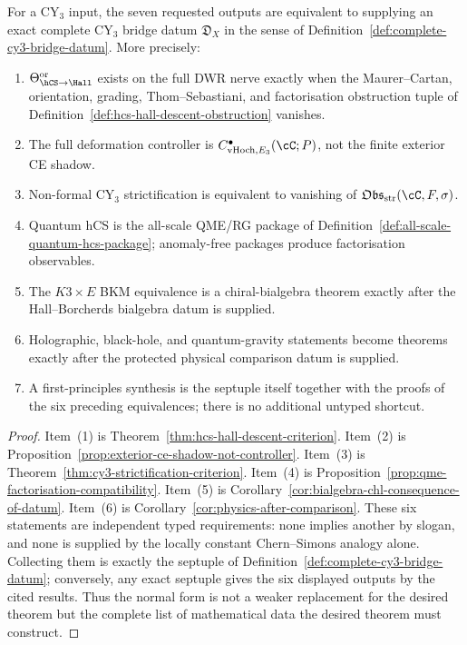 \begin{theorem}
\label{thm:seven-rigidification-normal-form}
For a CY$_3$ input, the seven requested outputs are equivalent to
supplying an exact complete CY$_3$ bridge datum
$\mathfrak D_X$ in the sense of
Definition~\ref{def:complete-cy3-bridge-datum}. More precisely:
\begin{enumerate}
\item $\Theta_{\hCS\to\Hall}^{\mathrm{or}}$ exists on the full
DWR nerve exactly when the Maurer--Cartan, orientation, grading,
Thom--Sebastiani, and factorisation obstruction tuple of
Definition~\ref{def:hcs-hall-descent-obstruction} vanishes.
\item The full deformation controller is
$C^{\bullet}_{\mathrm{vHoch},E_3}(\cC;P)$, not the finite exterior CE
shadow.
\item Non-formal CY$_3$ strictification is equivalent to vanishing of
$\mathfrak{Obs}_{\mathrm{str}}(\cC,F,\sigma)$.
\item Quantum hCS is the all-scale QME/RG package of
Definition~\ref{def:all-scale-quantum-hcs-package}; anomaly-free
packages produce factorisation observables.
\item The $K3\times E$ BKM equivalence is a chiral-bialgebra theorem
exactly after the Hall--Borcherds bialgebra datum is supplied.
\item Holographic, black-hole, and quantum-gravity statements become
theorems exactly after the protected physical comparison datum is
supplied.
\item A first-principles synthesis is the septuple itself together with
the proofs of the six preceding equivalences; there is no additional
untyped shortcut.
\end{enumerate}
\end{theorem}

\begin{proof}
Item~(1) is Theorem~\ref{thm:hcs-hall-descent-criterion}. Item~(2) is
Proposition~\ref{prop:exterior-ce-shadow-not-controller}. Item~(3) is
Theorem~\ref{thm:cy3-strictification-criterion}. Item~(4) is
Proposition~\ref{prop:qme-factorisation-compatibility}. Item~(5) is
Corollary~\ref{cor:bialgebra-chl-consequence-of-datum}. Item~(6) is
Corollary~\ref{cor:physics-after-comparison}. These six statements are
independent typed requirements: none implies another by slogan, and
none is supplied by the locally constant Chern--Simons analogy alone.
Collecting them is exactly the septuple of
Definition~\ref{def:complete-cy3-bridge-datum}; conversely, any exact
septuple gives the six displayed outputs by the cited results. Thus
the normal form is not a weaker replacement for the desired theorem but
the complete list of mathematical data the desired theorem must
construct.
\end{proof}

